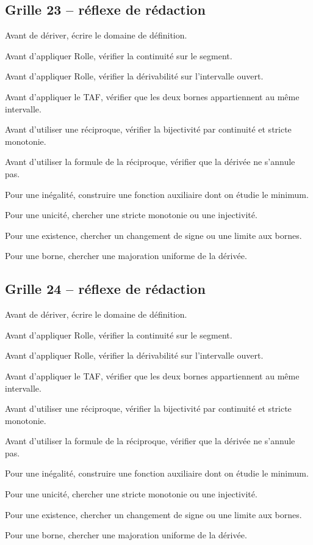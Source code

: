 \documentclass[11pt,a4paper]{article}
\begin{document}
\subsection*{Grille 23 -- réflexe de rédaction}

\begin{methodebox}

Avant de dériver, écrire le domaine de définition.

Avant d'appliquer Rolle, vérifier la continuité sur le segment.

Avant d'appliquer Rolle, vérifier la dérivabilité sur l'intervalle ouvert.

Avant d'appliquer le TAF, vérifier que les deux bornes appartiennent au même intervalle.

Avant d'utiliser une réciproque, vérifier la bijectivité par continuité et stricte monotonie.

Avant d'utiliser la formule de la réciproque, vérifier que la dérivée ne s'annule pas.

Pour une inégalité, construire une fonction auxiliaire dont on étudie le minimum.

Pour une unicité, chercher une stricte monotonie ou une injectivité.

Pour une existence, chercher un changement de signe ou une limite aux bornes.

Pour une borne, chercher une majoration uniforme de la dérivée.

\end{methodebox}

\subsection*{Grille 24 -- réflexe de rédaction}

\begin{methodebox}

Avant de dériver, écrire le domaine de définition.

Avant d'appliquer Rolle, vérifier la continuité sur le segment.

Avant d'appliquer Rolle, vérifier la dérivabilité sur l'intervalle ouvert.

Avant d'appliquer le TAF, vérifier que les deux bornes appartiennent au même intervalle.

Avant d'utiliser une réciproque, vérifier la bijectivité par continuité et stricte monotonie.

Avant d'utiliser la formule de la réciproque, vérifier que la dérivée ne s'annule pas.

Pour une inégalité, construire une fonction auxiliaire dont on étudie le minimum.

Pour une unicité, chercher une stricte monotonie ou une injectivité.

Pour une existence, chercher un changement de signe ou une limite aux bornes.

Pour une borne, chercher une majoration uniforme de la dérivée.

\end{methodebox}
\end{document}
